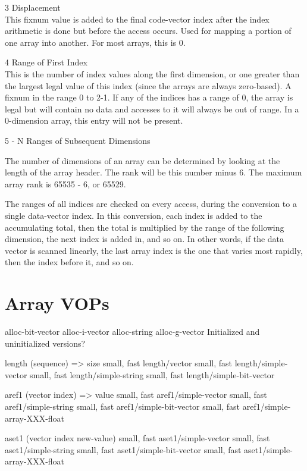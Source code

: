 {\begin{itemize, spread 0, spacing 1}
\begin{description}
3 Displacement \\This fixnum value is added to the final code-vector index
after the index arithmetic is done but before the access occurs.  Used for
mapping a portion of one array into another.  For most arrays, this is 0.

4 Range of First Index \\This is the number of index values along the first
dimension, or one greater than the largest legal value of this index (since the
arrays are always zero-based).	A fixnum in the range 0 to 2-1.  If any
of the indices has a range of 0, the array is legal but will contain no data
and accesses to it will always be out of range.  In a 0-dimension array, this
entry will not be present.

5 - N  Ranges of Subsequent Dimensions
\end{description}

The number of dimensions of an array can be determined by looking at the length
of the array header.  The rank will be this number minus 6.  The maximum array
rank is 65535 - 6, or 65529.

The ranges of all indices are checked on every access, during the conversion to
a single data-vector index.  In this conversion, each index is added to the
accumulating total, then the total is multiplied by the range of the following
dimension, the next index is added in, and so on.  In other words, if the data
vector is scanned linearly, the last array index is the one that varies most
rapidly, then the index before it, and so on.



\section{Array VOPs}

alloc-bit-vector
alloc-i-vector
alloc-string
alloc-g-vector
    Initialized and uninitialized versions?


length (sequence) => size
{small, fast} length/vector
{small, fast} length/simple-vector
{small, fast} length/simple-string
{small, fast} length/simple-bit-vector

aref1 (vector index) => value
{small, fast} aref1/simple-vector
{small, fast} aref1/simple-string
{small, fast} aref1/simple-bit-vector
{small, fast} aref1/simple-array-XXX-float

aset1 (vector index new-value)
{small, fast} aset1/simple-vector
{small, fast} aset1/simple-string
{small, fast} aset1/simple-bit-vector
{small, fast} aset1/simple-array-XXX-float


\end{itemize, spread 0, spacing 1}}
